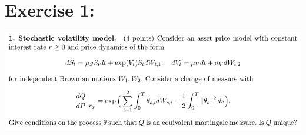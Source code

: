 \documentclass[document.tex]{subfiles}
\begin{document}
\section*{Exercise 1:}

\includegraphics[width=\textwidth]{ex1.png}
\end{document}

